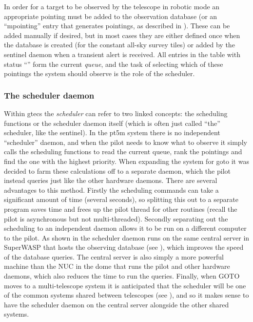\begin{colsection}
\begin{colsection}
In order for a target to be observed by the telescope in robotic mode an appropriate pointing must be added to the observation database (or an ``mpointing'' entry that generates pointings, as described in ). These can be added manually if desired, but in most cases they are either defined once when the database is created (for the constant all-sky survey tiles) or added by the sentinel daemon when a transient alert is received. All entries in the  table with status ``'' form the current \textit{queue}, and the task of selecting which of these pointings the system should observe is the role of the scheduler.

\subsubsection{The scheduler daemon}

Within \gls{gtecs} the \textit{scheduler} can refer to two linked concepts: the scheduling functions or the scheduler daemon itself (which is often just called ``the'' scheduler, like the sentinel). In the \gls{pt5m} system there is no independent ``scheduler'' daemon, and when the pilot needs to know what to observe it simply calls the scheduling functions to read the current queue, rank the pointings and find the one with the highest priority. When expanding the system for \gls{goto} it was decided to farm these calculations off to a separate daemon, which the pilot instead queries just like the other hardware daemons. There are several advantages to this method. Firstly the scheduling commands can take a significant amount of time (several seconds), so splitting this out to a separate program saves time and frees up the pilot thread for other routines (recall the pilot is asynchronous but not multi-threaded). Secondly separating out the scheduling to an independent daemon allows it to be run on a different computer to the pilot. As shown in  the scheduler daemon runs on the same central server in SuperWASP that hosts the observing database (see ), which improves the speed of the database queries. The central server is also simply a more powerful machine than the NUC in the dome that runs the pilot and other hardware daemons, which also reduces the time to run the queries. Finally, when GOTO moves to a multi-telescope system it is anticipated that the scheduler will be one of the common systems shared between telescopes (see ), and so it makes sense to have the scheduler daemon on the central server alongside the other shared systems.


\end{colsection}
\end{colsection}
